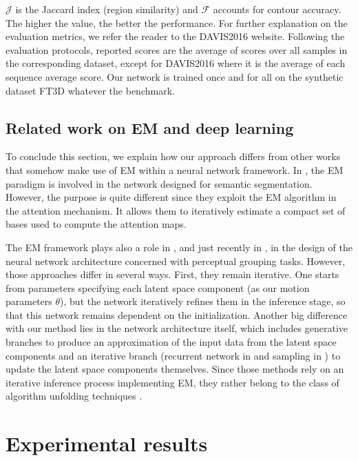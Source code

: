\documentclass[10pt,twocolumn,letterpaper]{article}
\begin{document}
\begin{table*}[tb!]
{$\mathcal{J}$ is the Jaccard index (region similarity) and $\mathcal{F}$ accounts for contour accuracy. The higher the value, the better the performance. For further explanation on the evaluation metrics, we refer the reader to the DAVIS2016 website. Following the evaluation protocols, reported scores are the average of scores over all samples in the corresponding dataset, except for DAVIS2016 where it is the average of each sequence average score. {\color{black} Our network is trained once and for all on the synthetic dataset FT3D whatever the benchmark.}
}
 \label{tab:results}
 \vspace{-0.6cm}
\end{table*}

\subsection{Related work on EM and deep learning}

To conclude this section, we explain how our approach differs from other works that somehow make use of EM within a neural network framework. 
In \cite{li2019}, the EM paradigm is involved in the network designed for semantic segmentation. However, the purpose is quite different since they exploit the EM algorithm in the attention mechanism. It allows them to iteratively estimate a compact set of bases used to compute the attention maps.

The EM framework plays also a role in \cite{greff2016,greff2017}, and just recently in \cite{Yu-2021}, in the design of the neural network architecture concerned with perceptual grouping tasks. However, those approaches differ in several ways. First, they remain iterative. One starts from parameters specifying each latent space component (as our motion parameters $\theta$), but the network iteratively refines them in the inference stage, so that this network remains dependent on the initialization. Another big difference with our method lies in the network architecture itself, which includes generative branches to produce an approximation of the input data from the latent space components and an iterative branch (recurrent network in \cite{greff2016,greff2017} and sampling in \cite{Yu-2021}) to update the latent space components themselves. 
Since those methods rely on an iterative inference process implementing EM, they rather belong to the class of algorithm unfolding techniques \cite{monga2021}. 

\section{Experimental results}
\label{results}
\end{document}
